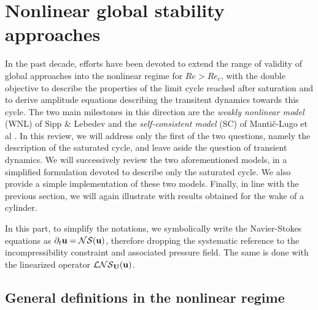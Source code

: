 \documentclass[twocolumn,10pt]{asme2ej}
\begin{document}
\section{Nonlinear global stability approaches}
\vspace{.2cm}



In the past decade, efforts have been devoted to extend the range of validity of global approaches into the nonlinear regime for $Re>Re_c$, with the double objective to describe the properties of the limit cycle reached after saturation and to derive amplitude equations describing the transitent dynamics towards this cycle. The two main milestones in this direction  are the {\em weakly nonlinear model}  (WNL) of Sipp \& Lebedev \cite{SippLebedev} and the {\em self-consistent model} (SC) of Manti\v{c}-Lugo et al \cite{MLugo2014}.
 In this review, we will address only the first of the two questions, namely  the description of the saturated cycle, and leave aside the question of transient dynamics. We will successively review the two aforementioned models, in a simplified formulation devoted to describe only the saturated cycle. We also provide a simple implementation of these two models. Finally, in line with the previous section, we will again illustrate with results obtained for the wake of a cylinder.
  
 In this part, to simplify the notations, we symbolically write the Navier-Stokes equations as $\partial_t {\bf u} = {\cal NS} ({\bf u})$, therefore dropping the systematic reference to the incompressibility constraint and associated pressure field. The same is done with the linearized operator ${\cal LNS}_{{\bf U}}( {\bf u})$. 

\subsection{General definitions in the nonlinear regime}
\end{document}
